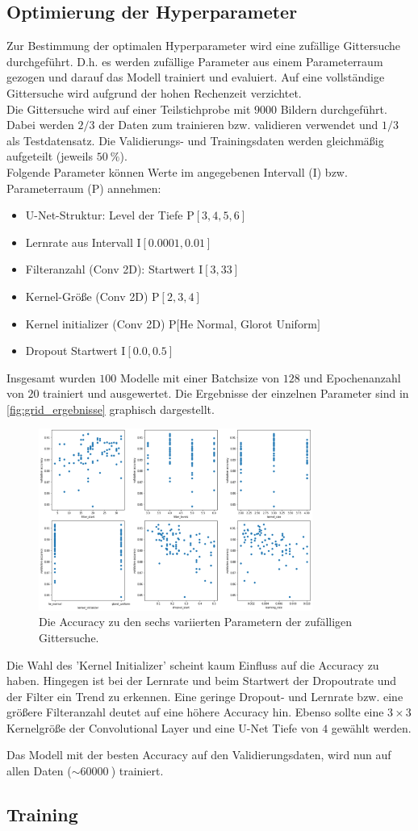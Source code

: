 \subsection{Optimierung der Hyperparameter}
\label{sec:Hyperparameter}
Zur Bestimmung der optimalen Hyperparameter wird eine zufällige Gittersuche durchgeführt.
D.h. es werden zufällige Parameter aus einem Parameterraum gezogen und darauf das Modell trainiert und evaluiert.
Auf eine vollständige Gittersuche wird aufgrund der hohen Rechenzeit verzichtet.
\\
Die Gittersuche wird auf einer Teilstichprobe mit $9000$ Bildern durchgeführt.
Dabei werden $2/3$ der Daten zum trainieren bzw. validieren verwendet und $1/3$ als Testdatensatz.
Die Validierungs- und Trainingsdaten werden gleichmäßig aufgeteilt (jeweils $\SI{50}{\percent}$).
\\
Folgende Parameter können Werte im angegebenen Intervall (I) bzw. Parameterraum (P) annehmen:
\begin{itemize}
    \item U-Net-Struktur: Level der Tiefe P$[3, 4, 5, 6]$
    \item Lernrate aus Intervall I$[0.0001, 0.01]$
    \item Filteranzahl (Conv 2D): Startwert I$[3, 33]$
    \item Kernel-Größe (Conv 2D) P$[2, 3, 4]$
    \item Kernel initializer (Conv 2D) P$[$He Normal, Glorot Uniform$]$
    \item Dropout Startwert I$[0.0, 0.5]$
\end{itemize}
Insgesamt wurden $100$ Modelle mit einer Batchsize von $128$ und Epochenanzahl von $20$ trainiert und ausgewertet.
Die Ergebnisse der einzelnen Parameter sind in \autoref{fig:grid_ergebnisse} graphisch dargestellt.
\begin{figure}
    \centering
    \includegraphics[width=0.8\textwidth]{content/img/grid_ergebnisse.png}
    \caption{Die Accuracy zu den sechs variierten Parametern der zufälligen Gittersuche.}
    \label{fig:grid_ergebnisse}
\end{figure}
\FloatBarrier
Die Wahl des 'Kernel Initializer' scheint kaum Einfluss auf die Accuracy zu haben.
Hingegen ist bei der Lernrate und beim Startwert der Dropoutrate und der Filter ein Trend zu erkennen.
Eine geringe Dropout- und Lernrate bzw. eine größere Filteranzahl deutet auf eine höhere Accuracy hin.
Ebenso sollte eine $3\times3$ Kernelgröße der Convolutional Layer und eine U-Net Tiefe von $4$ gewählt werden.

Das Modell mit der besten Accuracy auf den Validierungsdaten, wird nun auf allen Daten ($\sim \SI{60000}{}$) trainiert.

\subsection{Training}
%